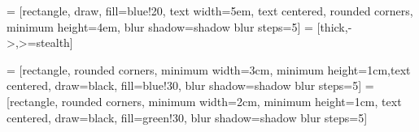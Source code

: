 \usepackage{tikz}
\usetikzlibrary{positioning, shapes.geometric, arrows.meta, shadows.blur, chains, decorations.markings, fit, matrix}

 = [rectangle, draw, fill=blue!20, text width=5em, text centered, rounded corners, minimum height=4em, blur shadow={shadow blur steps=5}]
 = [thick,->,>=stealth]

 = [rectangle, rounded corners, minimum width=3cm, minimum height=1cm,text centered, draw=black, fill=blue!30, blur shadow={shadow blur steps=5}]
 = [rectangle, rounded corners, minimum width=2cm, minimum height=1cm, text centered, draw=black, fill=green!30, blur shadow={shadow blur steps=5}]